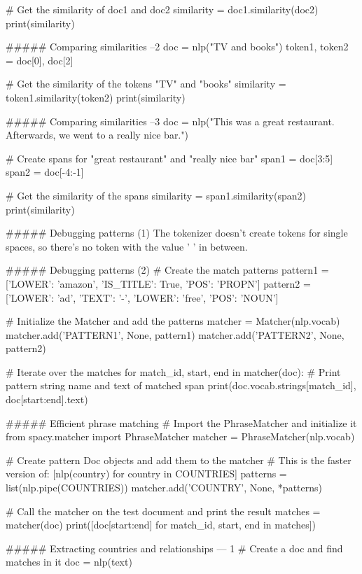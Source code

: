 # Get the similarity of doc1 and doc2
similarity = doc1.similarity(doc2)
print(similarity)



##### Comparing similarities  --2
doc = nlp("TV and books")
token1, token2 = doc[0], doc[2]

# Get the similarity of the tokens "TV" and "books" 
similarity = token1.similarity(token2)
print(similarity)



##### Comparing similarities  --3
doc = nlp("This was a great restaurant. Afterwards, we went to a really nice bar.")

# Create spans for "great restaurant" and "really nice bar"
span1 = doc[3:5]
span2 = doc[-4:-1]

# Get the similarity of the spans
similarity = span1.similarity(span2)
print(similarity)

##### Debugging patterns (1)
The tokenizer doesn't create tokens for single spaces, so there's no token with the value ' ' in between.


##### Debugging patterns (2)
# Create the match patterns
pattern1 = [{'LOWER': 'amazon'}, {'IS_TITLE': True, 'POS': 'PROPN'}]
pattern2 = [{'LOWER': 'ad'}, {'TEXT': '-'}, {'LOWER': 'free'}, {'POS': 'NOUN'}]

# Initialize the Matcher and add the patterns
matcher = Matcher(nlp.vocab)
matcher.add('PATTERN1', None, pattern1)
matcher.add('PATTERN2', None, pattern2)

# Iterate over the matches
for match_id, start, end in matcher(doc):
    # Print pattern string name and text of matched span
    print(doc.vocab.strings[match_id], doc[start:end].text)
    
    
    
##### Efficient phrase matching
# Import the PhraseMatcher and initialize it
from spacy.matcher import PhraseMatcher
matcher = PhraseMatcher(nlp.vocab)

# Create pattern Doc objects and add them to the matcher
# This is the faster version of: [nlp(country) for country in COUNTRIES]
patterns = list(nlp.pipe(COUNTRIES))
matcher.add('COUNTRY', None, *patterns)

# Call the matcher on the test document and print the result
matches = matcher(doc)
print([doc[start:end] for match_id, start, end in matches])



##### Extracting countries and relationships  --- 1
# Create a doc and find matches in it
doc = nlp(text)


